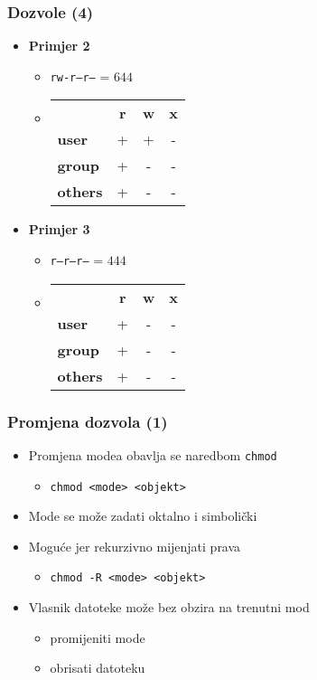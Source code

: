 \documentclass[table,usenames,dvipsnames]{beamer}
\newcommand{\shell}[1]{\texttt{#1}}
\begin{document}
\begin{frame}[t]
	\frametitle{Dozvole (4)}
\begin{itemize}
	\item \textbf{Primjer 2}
	\begin{itemize}
	    \item[] \shell{rw-r--r--} = $644$
	    \item[] \hspace{1em} \begin{tabular}{l c c c}
	    	& \textbf{r} & \textbf{w} & \textbf{x}\\
	    	\textbf{user} & + & + & -\\
	    	\textbf{group} & + & - & -\\
	    	\textbf{others} & + & - & -
	    \end{tabular}
	\end{itemize}
\end{itemize}
\vfill
\begin{itemize}
	\item \textbf{Primjer 3}
	\begin{itemize}
	    \item[] \shell{r--r--r--} = $444$
	    \item[] \hspace{1em} \begin{tabular}{l c c c}
	    	& \textbf{r} & \textbf{w} & \textbf{x}\\
	    	\textbf{user} & + & - & -\\
	    	\textbf{group} & + & - & -\\
	    	\textbf{others} & + & - & -
	    \end{tabular}
	\end{itemize}
\end{itemize}
\end{frame}

\begin{frame}[t]
\frametitle{Promjena dozvola (1)}
\begin{itemize}
  \item Promjena modea obavlja se naredbom \shell{chmod}
  \begin{itemize}
    \item[] \shell{chmod <mode> <objekt>}
  \end{itemize}
  \item Mode se može zadati oktalno i simbolički
  \item Moguće jer rekurzivno mijenjati prava
  \begin{itemize}
    \item[] \shell{chmod -R <mode> <objekt>}
  \end{itemize}
  \vfill
   	\item Vlasnik datoteke može bez obzira na trenutni mod
   	\begin{itemize}
		\item promijeniti mode
   		\item obrisati datoteku
   	\end{itemize}
\end{itemize}
\end{frame}
\end{document}
